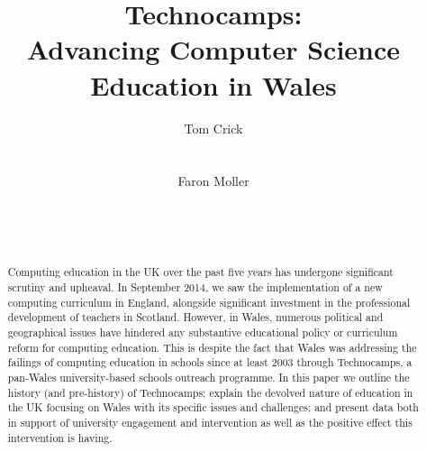 \documentclass{sig-alternate}
\begin{document}
%

\title{Technocamps: \\[1ex] Advancing Computer Science Education in Wales}


\author{
\alignauthor
Tom Crick\\
\\
\\
\alignauthor
Faron Moller\\
\\
\\
\\
}

\maketitle

\begin{abstract}
Computing education in the UK over the past five years has undergone
significant scrutiny and upheaval. In September 2014, we saw the
implementation of a new computing curriculum in England, alongside
significant investment in the professional development of teachers in
Scotland. However, in Wales, numerous political and geographical
issues have hindered any substantive educational policy or curriculum
reform for computing education. This is despite the fact that Wales
was addressing the failings of computing education in schools since at
least 2003 through Technocamps, a pan-Wales university-based schools
outreach programme. In this paper we outline the history (and
pre-history) of Technocamps; explain the devolved nature of education
in the UK focusing on Wales with its specific issues and challenges;
and present data both in support of university engagement and
intervention as well as the positive effect this intervention is
having.
\end{abstract}
\end{document}

